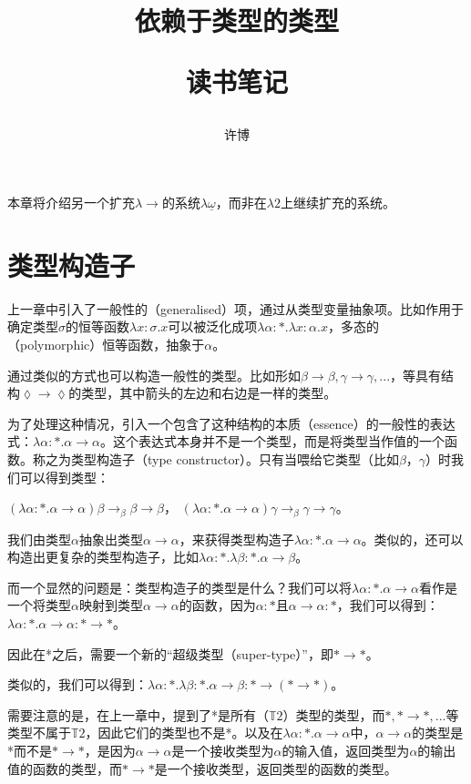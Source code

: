 \documentclass[UTF8]{article}
\title{依赖于类型的类型\\[2ex]\begin{large}读书笔记\end{large}}
\author{许博}
\date{}
\begin{document}
\maketitle
		\noindent
		本章将介绍另一个扩充$\lambda{\rightarrow}$的系统$\lambda{\underline{\omega}}$，而非在$\lambda{2}$上继续扩充的系统。

	\section{类型构造子}
		\noindent
		上一章中引入了一般性的（generalised）项，通过从类型变量抽象项。比如作用于确定类型$\sigma$的恒等函数$\lambda x:\sigma.x$可以被泛化成项$\lambda\alpha:*.\lambda x:\alpha.x$，多态的（polymorphic）恒等函数，抽象于$\alpha$。
		
		通过类似的方式也可以构造一般性的类型。比如形如$\beta\rightarrow\beta,\gamma\rightarrow\gamma,...$，等具有结构$\lozenge\rightarrow\lozenge$的类型，其中箭头的左边和右边是一样的类型。
		
		为了处理这种情况，引入一个包含了这种结构的本质（essence）的一般性的表达式：$\lambda\alpha:*.\alpha\rightarrow\alpha$。这个表达式本身并不是一个类型，而是将类型当作值的一个函数。称之为类型构造子（type constructor）。只有当喂给它类型（比如$\beta$，$\gamma$）时我们可以得到类型：
		
		$(\lambda\alpha:*.\alpha\rightarrow\alpha)\beta\rightarrow_\beta\beta\rightarrow\beta$，
		$(\lambda\alpha:*.\alpha\rightarrow\alpha)\gamma\rightarrow_\beta\gamma\rightarrow\gamma$。
		
		我们由类型$\alpha$抽象出类型$\alpha\rightarrow\alpha$，来获得类型构造子$\lambda\alpha:*.\alpha\rightarrow\alpha$。类似的，还可以构造出更复杂的类型构造子，比如$\lambda\alpha:*.\lambda\beta:*.\alpha\rightarrow\beta$。
		
		而一个显然的问题是：类型构造子的类型是什么？我们可以将$\lambda\alpha:*.\alpha\rightarrow\alpha$看作是一个将类型$\alpha$映射到类型$\alpha\rightarrow\alpha$的函数，因为$\alpha:*$且$\alpha\rightarrow\alpha:*$，我们可以得到：$\lambda\alpha:*.\alpha\rightarrow\alpha:*\rightarrow*$。
		
		因此在*之后，需要一个新的“超级类型（super-type）”，即$*\rightarrow*$。
		
		类似的，我们可以得到：$\lambda\alpha:*.\lambda\beta:*.\alpha\rightarrow\beta:*\rightarrow(*\rightarrow*)$。
		
		需要注意的是，在上一章中，提到了*是所有（$\mathbb{T}2$）类型的类型，而$*,*\rightarrow*,...$等类型不属于$\mathbb{T}2$，因此它们的类型也不是*。以及在$\lambda\alpha:*.\alpha\rightarrow\alpha$中，$\alpha\rightarrow\alpha$的类型是*而不是$*\rightarrow*$，是因为$\alpha\rightarrow\alpha$是一个接收类型为$\alpha$的输入值，返回类型为$\alpha$的输出值的函数的类型，而$*\rightarrow*$是一个接收类型，返回类型的函数的类型。
		
\end{document}
